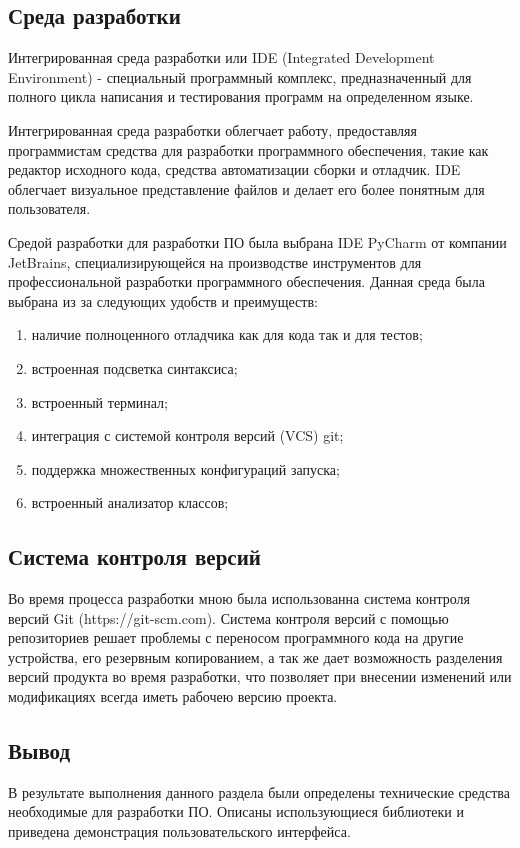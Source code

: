 \subsection{Среда разработки}
Интегрированная среда разработки или IDE (Integrated Development Environment) - специальный программный комплекс, предназначенный для полного цикла написания и тестирования программ на определенном языке.

Интегрированная среда разработки облегчает работу, предоставляя программистам средства для разработки программного обеспечения, такие как редактор исходного кода, средства автоматизации сборки и отладчик. 
IDE облегчает визуальное представление файлов и делает его более понятным для пользователя.

Средой разработки для разработки ПО была выбрана IDE PyCharm от компании JetBrains, специализирующейся на производстве инструментов для профессиональной разработки программного обеспечения.
Данная среда была выбрана из за следующих удобств и преимуществ:
\begin{enumerate}
	\item наличие полноценного отладчика как для кода так и для тестов;
	\item встроенная подсветка синтаксиса;
	\item встроенный терминал;
	\item интеграция с системой контроля версий (VCS) git;
	\item поддержка множественных конфигураций запуска;
	\item встроенный анализатор классов;
\end{enumerate}

\subsection{Система контроля версий}
Во время процесса разработки мною была использованна система контроля версий Git (https://git-scm.com). 
Система контроля версий с помощью репозиториев решает проблемы с переносом программного кода на другие устройства, его резервным копированием, а так же дает возможность разделения версий продукта во время разработки, что позволяет при внесении изменений или модификациях всегда иметь рабочею версию проекта.

\subsection{Вывод}
В результате выполнения данного раздела были определены технические средства необходимые для разработки ПО.
Описаны использующиеся библиотеки и приведена демонстрация пользовательского интерфейса.

